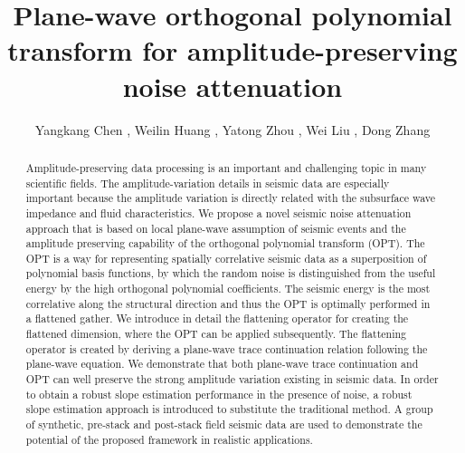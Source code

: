 

\title{Plane-wave orthogonal polynomial transform for amplitude-preserving noise attenuation}

\renewcommand{\thefootnote}{\fnsymbol{footnote}}
\author{Yangkang Chen \footnotemark[1], Weilin Huang \footnotemark[2], Yatong Zhou \footnotemark[3], Wei Liu \footnotemark[2], Dong Zhang \footnotemark[2]}
\address{
\footnotemark[1]
School of Earth Sciences\\
Zhejiang University\\
Hangzhou, Zhejiang Province, China, 310027\\
chenyk2016@gmail.com\\
\footnotemark[2]State Key Laboratory of Petroleum Resources and Prospecting\\
 China University of Petroleum-Beijing \\
 Beijing, China, 102249 \\
 cup\_hwl@126.com\\
 \footnotemark[3]Tianjin Key Laboratory of Electronic Materials and Devices\\
School of Electronics and Information Engineering\\
Hebei University of Technology\\
5340 Xiping Road, Beichen District\\
Tianjin 300401, P.R. China
}

\begin{abstract}
Amplitude-preserving data processing is an important and challenging topic in many scientific fields. The amplitude-variation details in seismic data are especially important because the amplitude variation is directly related with the subsurface wave impedance and fluid characteristics. We propose a novel seismic noise attenuation approach that is based on local plane-wave assumption of seismic events and the amplitude preserving capability of the orthogonal polynomial transform (OPT). The OPT is a way for representing spatially correlative seismic data as a superposition of polynomial basis functions, by which the random noise is distinguished from the useful energy by the high orthogonal polynomial coefficients. The seismic energy is the most correlative along the structural direction and thus the OPT is optimally performed in a flattened gather. We introduce in detail the flattening operator for creating the flattened dimension, where the OPT can be applied subsequently. The flattening operator is created by deriving a plane-wave trace continuation relation following the plane-wave equation. We demonstrate that both plane-wave trace continuation and OPT can well preserve the strong amplitude variation existing in seismic data. In order to obtain a robust slope estimation performance in the presence of noise, a robust slope estimation approach is introduced to substitute the traditional method. A group of synthetic, pre-stack and post-stack field seismic data are used to demonstrate the potential of the proposed framework in realistic applications.  
\end{abstract}


